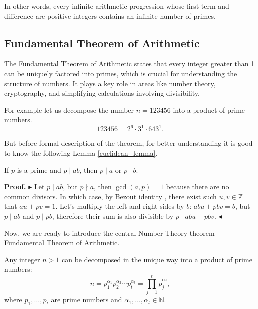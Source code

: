 \documentclass[../lecture-notes-148x210.tex]{subfiles}
\begin{document}
In other words, every infinite arithmetic progression whose first term and difference are positive integers contains an infinite number of primes.

\subsection{Fundamental Theorem of Arithmetic}
The Fundamental Theorem of Arithmetic states that every integer greater than 1 can be 
uniquely factored into primes, which is crucial for understanding the structure of numbers. 
It plays a key role in areas like number theory, cryptography, and simplifying 
calculations involving divisibility. 

\begin{example}
    For example let us decompose the number $n = 123456$ into a product of prime numbers.
    \begin{equation*}
        123456 = 2^6 \cdot 3^1 \cdot 643^1.
    \end{equation*}
\end{example}

But before formal description of the theorem, for better understanding it is good to know the following Lemma \ref{euclidean_lemma}.

\begin{lemma}[Euclidean] \label{euclidean_lemma}
    If $p$ is a prime and $p \mid ab$, then $p \mid a$ or $p \mid b$.
\end{lemma}

\textbf{Proof.} 
$\blacktriangleright$
Let $p \mid ab$, but $ p \nmid a$, then $\gcd(a, p) = 1$ because there are no common divisors.
In which case, by Bezout identity , there exist such $u, v \in \mathbb{Z}$ that $au + pv = 1$.
Let's multiply the left and right sides by $b$: $abu + pbv = b$, but $p \mid ab$ and $p \mid pb$, therefore their sum is also divisible by $p \mid abu + pbv$. 
$\blacktriangleleft$

Now, we are ready to introduce the central Number Theory theorem --- Fundamental
Theorem of Arithmetic.

\begin{theorem}\label{th:fundamental_arithmetic}
    Any integer $n>1$ can be decomposed in the unique way into a product of prime numbers:
    \begin{equation*}
        n = p_1^{\alpha_1}p_2^{\alpha_2}\cdots p_t^{\alpha_t} = \prod_{j=1}^t p_j^{\alpha_j},
    \end{equation*}
    where $p_1,\dots,p_t$ are prime numbers and $\alpha_1,\dots,\alpha_t \in \mathbb{N}$.
\end{theorem}
\end{document}
